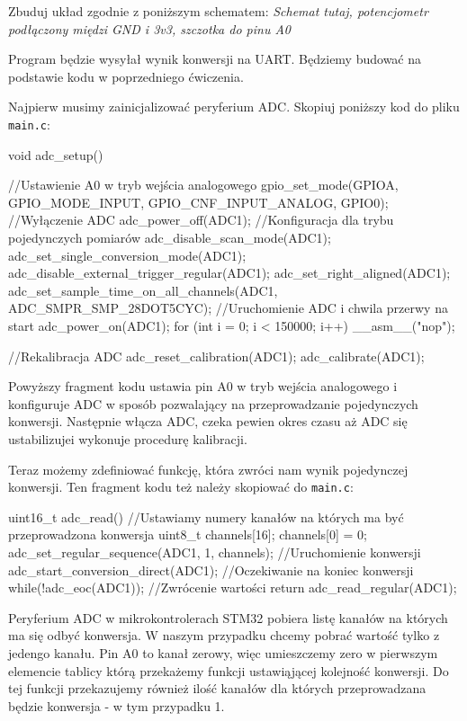 \documentclass{pdfBooklets}
\begin{document}
Zbuduj układ zgodnie z poniższym schematem:
\textit{Schemat tutaj, potencjometr podłączony międzi GND i 3v3, szczotka do pinu A0}

Program będzie wysyłał wynik konwersji na UART. Będziemy budować na podstawie kodu w poprzedniego ćwiczenia.

Najpierw musimy zainicjalizować peryferium ADC. Skopiuj poniższy kod do pliku \Verb$main.c$:
\begin{CodeFrame*}[c]{}
void adc_setup(){
  //Ustawienie A0 w tryb wejścia analogowego
  gpio_set_mode(GPIOA,
		GPIO_MODE_INPUT, GPIO_CNF_INPUT_ANALOG, GPIO0);
  //Wyłączenie ADC
  adc_power_off(ADC1);
  //Konfiguracja dla trybu pojedynczych pomiarów
  adc_disable_scan_mode(ADC1);
  adc_set_single_conversion_mode(ADC1);
  adc_disable_external_trigger_regular(ADC1);
  adc_set_right_aligned(ADC1);
  adc_set_sample_time_on_all_channels(ADC1,
				      ADC_SMPR_SMP_28DOT5CYC);
  //Uruchomienie ADC i chwila przerwy na start
  adc_power_on(ADC1);
  for (int i = 0; i < 150000; i++) __asm__("nop");
  
  //Rekalibracja ADC
  adc_reset_calibration(ADC1);
  adc_calibrate(ADC1);
  }
\end{CodeFrame*}

Powyższy fragment kodu ustawia pin A0 w tryb wejścia analogowego i konfiguruje ADC w sposób pozwalający na przeprowadzanie pojedynczych konwersji. Następnie włącza ADC, czeka pewien okres czasu aż ADC się ustabilizujei wykonuje procedurę kalibracji.

Teraz możemy zdefiniować funkcję, która zwróci nam wynik pojedynczej konwersji.
Ten fragment kodu też należy skopiować do \Verb$main.c$:
\begin{CodeFrame*}[c]{}
uint16_t adc_read(){
  //Ustawiamy numery kanałów na których ma być przeprowadzona konwersja
  uint8_t channels[16];
  channels[0] = 0;
  adc_set_regular_sequence(ADC1, 1, channels);
  //Uruchomienie konwersji
  adc_start_conversion_direct(ADC1);
  //Oczekiwanie na koniec konwersji
  while(!adc_eoc(ADC1));
  //Zwrócenie wartości
  return adc_read_regular(ADC1);
}
\end{CodeFrame*}

Peryferium ADC w mikrokontrolerach STM32 pobiera listę kanałów na których ma się odbyć konwersja. W naszym przypadku chcemy pobrać
wartość tylko z jedengo kanału. Pin A0 to kanał zerowy, więc umieszczemy zero w pierwszym elemencie tablicy którą przekażemy
funkcji ustawiąjącej kolejność konwersji. Do tej funkcji przekazujemy również ilość kanałów dla których przeprowadzana będzie
konwersja - w tym przypadku 1.
\end{document}
